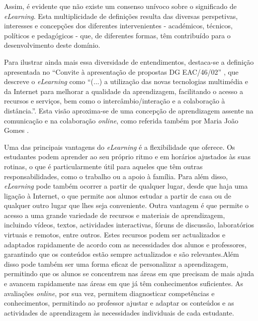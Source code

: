 Assim, é evidente que não existe um consenso unívoco sobre o significado de \textit{eLearning}. Esta multiplicidade de definições resulta das diversas perspetivas, interesses e concepções dos diferentes intervenientes - académicos, técnicos, políticos e pedagógicos - que, de diferentes formas, têm contribuído para o desenvolvimento deste domínio.

Para ilustrar ainda mais essa diversidade de entendimentos, destaca-se a definição apresentada no ``Convite à apresentação de propostas DG EAC/46/02'' \cite{comissao197_07}, que descreve o \textit{eLearning} como ``(...) a utilização das novas tecnologias multimédia e da Internet para melhorar a qualidade da aprendizagem, facilitando o acesso a recursos e serviços, bem como o intercâmbio/interação e a colaboração à distância.''. Esta visão aproxima-se de uma concepção de aprendizagem assente na comunicação e na colaboração \textit{online}, como referida também por Maria João Gomes \cite{gomes_e-learning_2005}.

Uma das principais vantagens do \textit{eLearning} é a flexibilidade que oferece. Os estudantes podem aprender ao seu próprio ritmo e em horários ajustados às suas rotinas, o que é particularmente útil para aqueles que têm outras responsabilidades, como o trabalho ou a apoio à família. Para além disso, \textit{eLearning} pode também ocorrer a partir de qualquer lugar, desde que haja uma ligação à Internet, o que permite aos alunos estudar a partir de casa ou de qualquer outro lugar que lhes seja conveniente. Outra vantagem é que permite o acesso a uma grande variedade de recursos e materiais de aprendizagem, incluindo vídeos, textos, actividades interactivas, fóruns de discussão, laboratórios virtuais e remotos, entre outros. Estes recursos podem ser actualizados e adaptados rapidamente de acordo com as necessidades dos alunos e professores, garantindo que os conteúdos estão sempre actualizados e são relevantes.Além disso pode também ser uma forma eficaz de personalizar a aprendizagem, permitindo que os alunos se concentrem nas áreas em que precisam de mais ajuda e avancem rapidamente nas áreas em que já têm conhecimentos suficientes. As avaliações \textit{online}, por sua vez, permitem diagnosticar competências e conhecimentos, permitindo ao professor ajustar e adaptar os conteúdos e as actividades de aprendizagem às necessidades individuais de cada estudante.

